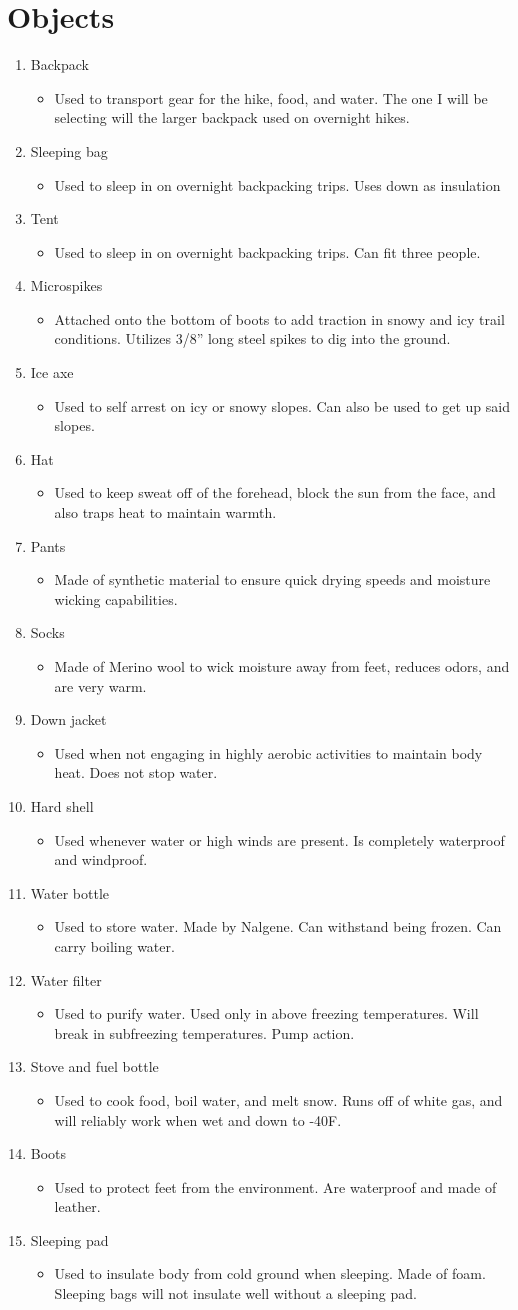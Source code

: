 \documentclass[10pt]{article}
\newcommand{\ol}[1]{\begin{enumerate}[noitemsep]#1\end{enumerate}}
\newcommand{\ul}[1]{\begin{itemize}[noitemsep]#1\end{itemize}}
\newcommand{\li}[1]{\item#1}
\begin{document}
\section*{Objects}
\ol{%
	\li{Backpack}
	\ul{%
		\li{Used to transport gear for the hike, food, and water. The one I will be selecting will the larger backpack used on overnight hikes.}
		}
	\li{Sleeping bag}
	\ul{%
		\li{Used to sleep in on overnight backpacking trips. Uses down as insulation}
		}
	\li{Tent}
	\ul{%
		\li{Used to sleep in on overnight backpacking trips. Can fit three people.}
		}
	\li{Microspikes}
	\ul{%
		\li{Attached onto the bottom of boots to add traction in snowy and icy trail conditions. Utilizes 3/8'' long steel spikes to dig into the ground.}
		}
	\li{Ice axe}
	\ul{%
		\li{Used to self arrest on icy or snowy slopes. Can also be used to get up said slopes.}
		}
	
	\li{Hat}
	\ul{%
		\li{Used to keep sweat off of the forehead, block the sun from the face, and also traps heat to maintain warmth.}
		}
	\li{Pants}
	\ul{%
		\li{Made of synthetic material to ensure quick drying speeds and moisture wicking capabilities.}
		}
	\li{Socks}
	\ul{%
		\li{Made of Merino wool to wick moisture away from feet, reduces odors, and are very warm.}
		}
	\li{Down jacket}
	\ul{%
		\li{Used when not engaging in highly aerobic activities to maintain body heat. Does not stop water.}
		}
	\li{Hard shell}
	\ul{%
		\li{Used whenever water or high winds are present. Is completely waterproof and windproof.}
		}

	\li{Water bottle}
	\ul{%
		\li{Used to store water. Made by Nalgene. Can withstand being frozen. Can carry boiling water.}
		}
	\li{Water filter}
	\ul{%
		\li{Used to purify water. Used only in above freezing temperatures. Will break in subfreezing temperatures. Pump action.}
		}
	\li{Stove and fuel bottle}
	\ul{%
		\li{Used to cook food, boil water, and melt snow. Runs off of white gas, and will reliably work when wet and down to -40\degree F.}
		}
	\li{Boots}
	\ul{%
		\li{Used to protect feet from the environment. Are waterproof and made of leather.}
		}
	\li{Sleeping pad}
	\ul{%
		\li{Used to insulate body from cold ground when sleeping. Made of foam. Sleeping bags will not insulate well without a sleeping pad.}
		}
}
\end{document}
